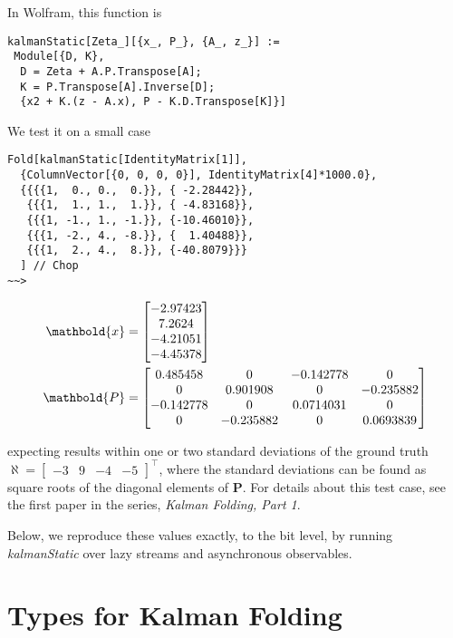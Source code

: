 \documentclass[10pt,oneside,x11names]{article}
\begin{document}
In Wolfram, this function is

\begin{verbatim}
kalmanStatic[Zeta_][{x_, P_}, {A_, z_}] :=
 Module[{D, K},
  D = Zeta + A.P.Transpose[A];
  K = P.Transpose[A].Inverse[D];
  {x2 + K.(z - A.x), P - K.D.Transpose[K]}]
\end{verbatim}

We test it on a small case

\begin{verbatim}
Fold[kalmanStatic[IdentityMatrix[1]],
  {ColumnVector[{0, 0, 0, 0}], IdentityMatrix[4]*1000.0},
  {{{{1,  0., 0.,  0.}}, { -2.28442}}, 
   {{{1,  1., 1.,  1.}}, { -4.83168}}, 
   {{{1, -1., 1., -1.}}, {-10.46010}}, 
   {{{1, -2., 4., -8.}}, {  1.40488}}, 
   {{{1,  2., 4.,  8.}}, {-40.8079}}}
  ] // Chop
~~>
\end{verbatim}

\begin{align}
\label{eqn:kalman-filter-results}
\mathbold{x} &=
\begin{bmatrix}
 -2.97423 \\
  7.2624  \\
 -4.21051 \\
 -4.45378 \\
\end{bmatrix}
\\
\notag
\mathbold{P} &=
\begin{bmatrix}
 0.485458 & 0 & -0.142778 & 0 \\
 0 & 0.901908 & 0 & -0.235882 \\
 -0.142778 & 0 & 0.0714031 & 0 \\
 0 & -0.235882 & 0 & 0.0693839 \\
\end{bmatrix}
\end{align}

\noindent expecting results within one or two standard deviations of the ground
truth \(\aleph=\begin{bmatrix}-3& 9& -4& -5\end{bmatrix}^\intercal\), where the
standard deviations can be found as square roots of the diagonal
elements of \(\mathbold{P}\). For details about this test case, see the first
paper in the series, \emph{Kalman Folding, Part 1}.\footnotemark[1]{}

Below, we reproduce these values exactly, to the bit level, by running
\emph{kalmanStatic} over lazy streams and asynchronous observables.

\section{Types for Kalman Folding}
\label{sec:orgheadline4}
\end{document}

